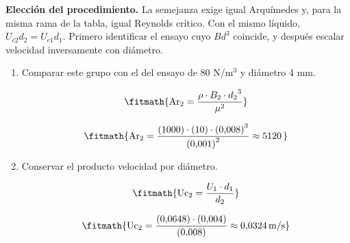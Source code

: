 \noindent\textbf{Elección del procedimiento.} La semejanza exige igual Arquímedes y, para la misma rama de la tabla, igual Reynolds crítico. Con el mismo líquido, $U_{c2}d_2=U_{c1}d_1$. Primero identificar el ensayo cuyo $Bd^3$ coincide, y después escalar velocidad inversamente con diámetro.

\begin{enumerate}

\item Comparar este grupo con el del ensayo de 80 N/m$^3$ y diámetro 4 mm.

\[\fitmath{\mathrm{Ar}_{2}=\frac{\rho\cdot B_{2}\cdot {d_{2}}^{3}}{{\mu}^{2}}}\]

\[\fitmath{\mathrm{Ar}_{2}=\frac{(1000)\cdot (10)\cdot {(0{,}008)}^{3}}{{(0{,}001)}^{2}}\approx 5120\,}\]

\item Conservar el producto velocidad por diámetro.

\[\fitmath{\mathrm{Uc}_{2}=\frac{U_{1}\cdot d_{1}}{d_{2}}}\]

\[\fitmath{\mathrm{Uc}_{2}=\frac{(0{,}0648)\cdot (0{,}004)}{(0{,}008)}\approx 0{,}0324\,\mathrm{m/s}}\]

\end{enumerate}
